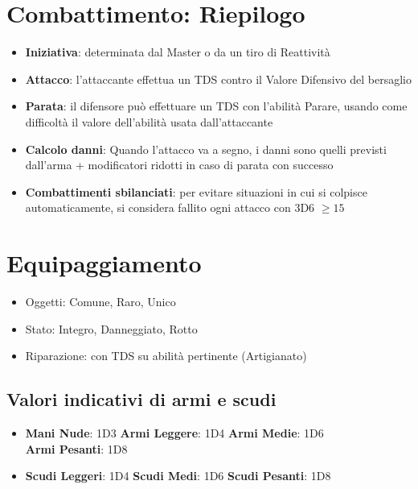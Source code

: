 \documentclass[../manuale_main.tex]{subfiles}
\begin{document}
\section*{Combattimento: Riepilogo}
\begin{itemize}
  \item \textbf{Iniziativa}: determinata dal Master o da un tiro di Reattivit\`a
  \item \textbf{Attacco}: l'attaccante effettua un TDS contro il Valore Difensivo del bersaglio
  \item \textbf{Parata}: il difensore pu\`o effettuare un TDS con l'abilit\`a Parare, usando come difficoltà il valore dell'abilità usata dall'attaccante
  \item \textbf{Calcolo danni}: Quando l'attacco va a segno, i danni sono quelli previsti dall'arma + modificatori ridotti in caso di parata con successo
  \item \textbf{Combattimenti sbilanciati}: per evitare situazioni in cui si colpisce automaticamente, si considera fallito ogni attacco con 3D6 \(\geq 15\)
\end{itemize}

\section*{Equipaggiamento}
\begin{itemize}
  \item Oggetti: Comune, Raro, Unico
  \item Stato: Integro, Danneggiato, Rotto
  \item Riparazione: con TDS su abilità pertinente (Artigianato)
\end{itemize}

\subsection*{Valori indicativi di armi e scudi}
\begin{itemize}
  \item \textbf{Mani Nude}: 1D3 \quad \textbf{Armi Leggere}: 1D4 \quad \textbf{Armi Medie}: 1D6 \\ \textbf{Armi Pesanti}: 1D8
  \item \textbf{Scudi Leggeri}: 1D4 \quad \textbf{Scudi Medi}: 1D6 \quad \textbf{Scudi Pesanti}: 1D8
\end{itemize}
\end{document}
